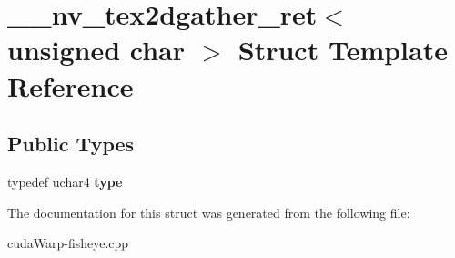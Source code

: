 \hypertarget{struct____nv__tex2dgather__ret_3_01unsigned_01char_01_4}{}\section{\+\_\+\+\_\+nv\+\_\+tex2dgather\+\_\+ret$<$ unsigned char $>$ Struct Template Reference}
\label{struct____nv__tex2dgather__ret_3_01unsigned_01char_01_4}
\subsection*{Public Types}
\begin{DoxyCompactItemize}
\item 
typedef uchar4 {\bfseries type}\hypertarget{struct____nv__tex2dgather__ret_3_01unsigned_01char_01_4_adf573c9997a141b381838e8f07ca3e2a}{}\label{struct____nv__tex2dgather__ret_3_01unsigned_01char_01_4_adf573c9997a141b381838e8f07ca3e2a}

\end{DoxyCompactItemize}


The documentation for this struct was generated from the following file\+:\begin{DoxyCompactItemize}
\item 
cuda\+Warp-\/fisheye.\+cpp\end{DoxyCompactItemize}
